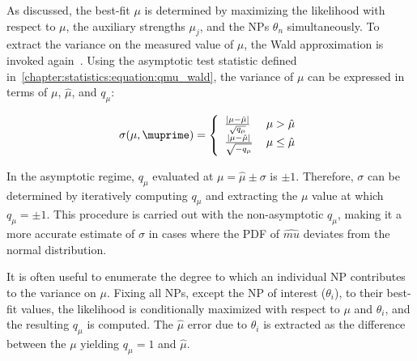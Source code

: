 As discussed, the best-fit $\mu$ is determined by maximizing the
likelihood with respect to $\mu$, the auxiliary strengths $\mu_j$, and
the NPs $\theta_n$ simultaneously. To extract the variance on the measured
value of $\mu$, the Wald approximation is invoked again~\cite{bib:Cowan:2010js}. Using the
asymptotic test statistic defined
in~\ref{chapter:statistics:equation:qmu_wald}, the variance of $\mu$
can be expressed in terms of $\mu$, $\hat{\mu}$, and $q_{\mu}$:

\begin{equation}
\sigma(\mu,\muprime) = \left\{
\begin{array}{ll}
\frac{|\mu-\hat{\mu}|}{\sqrt{q_{\mu}}} & \,
\mu > \hat{\mu}  \\
\frac{|\mu-\hat{\mu}|}{\sqrt{-q_{\mu}}} & \, \mu \leq
\hat{\mu} \\
\end{array}
\right.
\label{chapter:statistics:equation:muhat_error}
\end{equation}

\noindent
In the asymptotic regime, $q_{\mu}$ evaluated at $\mu
= \hat{\mu} \pm \sigma$ is $\pm 1$. Therefore, $\sigma$ can be
determined by iteratively computing $q_{\mu}$ and
extracting the $\mu$ value at which $q_{\mu} = \pm 1$.
This procedure is carried out with the non-asymptotic $q_{\mu}$,
making it a more accurate estimate of $\sigma$ in cases where the PDF
of $\hat{mu}$ deviates from the normal distribution. 

It is often useful to enumerate the degree to which an individual NP
contributes to the variance on $\mu$.  Fixing all NPs, except the NP of
interest ($\theta_i$), to their best-fit values, the likelihood is
conditionally
maximized with respect to $\mu$ and $\theta_i$, and the resulting
$q_{\mu}$ is computed.  The $\hat{\mu}$ error due to $\theta_i$ is
extracted as the difference between the $\mu$ yielding $q_{\mu} = 1$
and $\hat{\mu}$.
